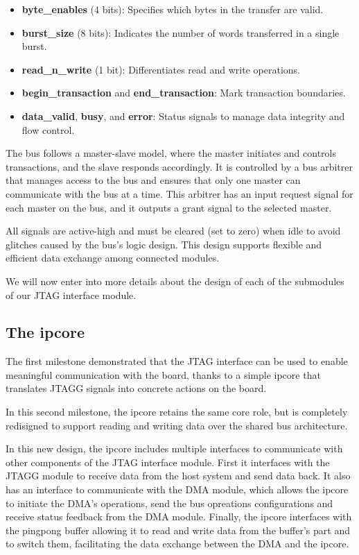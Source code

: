 \documentclass[a4paper,11pt,oneside]{report}
\begin{document}
\begin{itemize}
    \item \textbf{byte\_enables} (4 bits): Specifies which bytes in the transfer are valid.
    \item \textbf{burst\_size} (8 bits): Indicates the number of words transferred in a single burst.
    \item \textbf{read\_n\_write} (1 bit): Differentiates read and write operations.
    \item \textbf{begin\_transaction} and \textbf{end\_transaction}: Mark transaction boundaries.
    \item \textbf{data\_valid}, \textbf{busy}, and \textbf{error}: Status signals to manage data integrity and flow control.
\end{itemize}

The bus follows a master-slave model, where the master initiates and controls transactions, and the slave responds accordingly. It is
controlled by a bus arbitrer that manages access to the bus and ensures that only one master can communicate with the bus at a time.
This arbitrer has an input request signal for each master on the bus, and it outputs a grant signal to the selected master.

All signals are active-high and must be cleared (set to zero) when idle to avoid glitches caused by the bus’s logic design. 
This design supports flexible and efficient data exchange among connected modules.

We will now enter into more details about the design of each of the submodules of our JTAG interface module.

\subsection{The ipcore}

The first milestone demonstrated that the JTAG interface can be used to enable meaningful communication with the board, thanks to a simple ipcore that translates JTAGG signals into concrete actions on the board.

In this second milestone, the ipcore retains the same core role, but is completely redisigned to support reading and writing data over the shared bus architecture.

In this new design, the ipcore includes multiple interfaces to communicate with other components of the JTAG interface module.  
First it interfaces with the JTAGG module to receive data from the host system and send data back.
It also has an interface to communicate with the DMA module, which allows the ipcore to initiate the DMA's operations, send the bus opreations configurations and 
receive status feedback from the DMA module.
Finally, the ipcore interfaces with the pingpong buffer allowing it to read and write data from the buffer's part and to switch them, facilitating the data exchange between the DMA and the ipcore.
\end{document}
